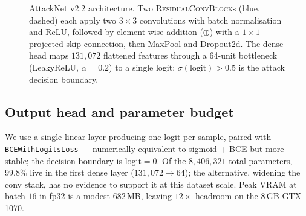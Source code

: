 \documentclass[anonymous, manuscript, screen, review]{acmart}
\begin{document}
\begin{figure}[htbp]
{%
}
\caption{AttackNet v2.2 architecture. Two \textsc{ResidualConvBlock}s (blue, dashed)
each apply two $3{\times}3$ convolutions with batch normalisation and ReLU, followed
by element-wise addition ($\oplus$) with a $1{\times}1$-projected skip connection,
then MaxPool and Dropout2d. The dense head maps $131{,}072$ flattened features
through a 64-unit bottleneck (LeakyReLU, $\alpha{=}0.2$) to a single logit;
$\sigma(\text{logit})>0.5$ is the attack decision boundary.}
\label{fig:architecture}
\end{figure}

\subsection{Output head and parameter budget}

We use a single linear layer producing one logit per sample, paired
with \texttt{BCEWithLogitsLoss} --- numerically equivalent to
sigmoid + BCE but more stable; the decision boundary is
$\text{logit} = 0$. Of the $8{,}406{,}321$ total parameters, $99{.}8\%$
live in the first dense layer ($131{,}072 \to 64$); the alternative,
widening the conv stack, has no evidence to support it at this dataset
scale. Peak VRAM at batch $16$ in fp32 is a modest $682$\,MB, leaving
$12{\times}$ headroom on the $8$\,GB GTX 1070.
\end{document}
